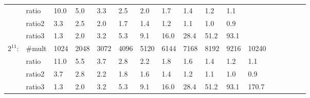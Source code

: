 \documentclass[10pt]{article}
\begin{document}
\begin{table*}
{\begin{tabular}{lllllllllllllllll}
          & ratio & 10.0& 5.0& 3.3& 2.5& 2.0& 1.7& 1.4& 1.2& 1.1\\
          & ratio2 & 3.3& 2.5& 2.0& 1.7& 1.4& 1.2& 1.1& 1.0& 0.9\\
          & ratio3 & 1.3& 2.0& 3.2& 5.3& 9.1& 16.0& 28.4& 51.2& 93.1\\[.3em]
$2^{11}$: & \#mult &  1024&  2048&  3072&  4096&  5120&  6144&  7168&  8192&  9216&  10240\\
          & ratio & 11.0& 5.5& 3.7& 2.8& 2.2& 1.8& 1.6& 1.4& 1.2& 1.1\\
          & ratio2 & 3.7& 2.8& 2.2& 1.8& 1.6& 1.4& 1.2& 1.1& 1.0& 0.9\\
          & ratio3 & 1.3& 2.0& 3.2& 5.3& 9.1& 16.0& 28.4& 51.2& 93.1& 170.7\\[.3em]

\hline
\end{tabular}
}


\end{table*}
\end{document}
